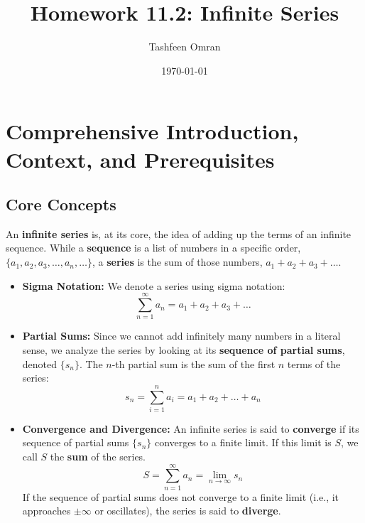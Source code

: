 \documentclass{article}
\title{Homework 11.2: Infinite Series}
\author{Tashfeen Omran}
\date{\today}
\begin{document}
\maketitle

\section{Comprehensive Introduction, Context, and Prerequisites}

\subsection{Core Concepts}
An \textbf{infinite series} is, at its core, the idea of adding up the terms of an infinite sequence. While a \textbf{sequence} is a list of numbers in a specific order, $\{a_1, a_2, a_3, \dots, a_n, \dots\}$, a \textbf{series} is the sum of those numbers, $a_1 + a_2 + a_3 + \dots$.

\begin{itemize}
    \item \textbf{Sigma Notation:} We denote a series using sigma notation:
    \[ \sum_{n=1}^{\infty} a_n = a_1 + a_2 + a_3 + \dots \]
    \item \textbf{Partial Sums:} Since we cannot add infinitely many numbers in a literal sense, we analyze the series by looking at its \textbf{sequence of partial sums}, denoted $\{s_n\}$. The $n$-th partial sum is the sum of the first $n$ terms of the series:
    \[ s_n = \sum_{i=1}^{n} a_i = a_1 + a_2 + \dots + a_n \]
    \item \textbf{Convergence and Divergence:} An infinite series is said to \textbf{converge} if its sequence of partial sums $\{s_n\}$ converges to a finite limit. If this limit is $S$, we call $S$ the \textbf{sum} of the series.
    \[ S = \sum_{n=1}^{\infty} a_n = \lim_{n \to \infty} s_n \]
    If the sequence of partial sums does not converge to a finite limit (i.e., it approaches $\pm\infty$ or oscillates), the series is said to \textbf{diverge}.
\end{itemize}
\end{document}
